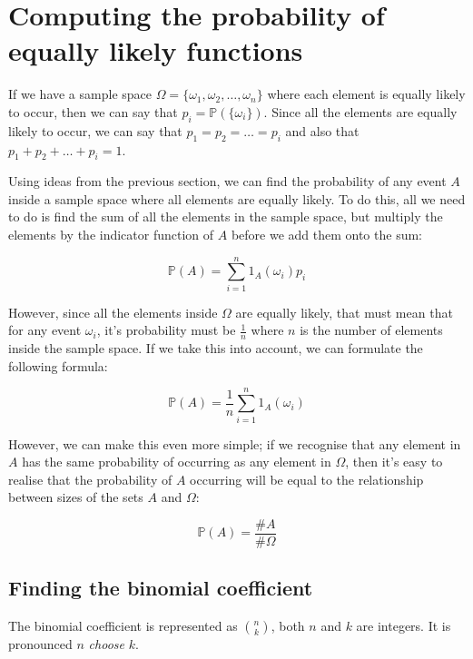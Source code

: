 \section{Computing the probability of equally likely functions}

If we have a sample space $\Omega = \{ \omega_1, \omega_2, \dots, \omega_n \}$
where each element is equally likely to occur, then we can say that $p_i =
\mathbb{P}(\{\omega_i\})$. Since all the elements are equally likely to occur,
we can say that $p_1 = p_2 = \dots = p_i$ and also that $p_1 + p_2 + \dots + p_i
= 1$.

Using ideas from the previous section, we can find the probability of any event
$A$ inside a sample space where all elements are equally likely. To do this, all
we need to do is find the sum of all the elements in the sample space, but
multiply the elements by the indicator function of $A$ before we add them onto
the sum:

\begin{dmath*}
	\mathbb{P}(A) = \sum\limits_{i=1}^{n} 1_A(\omega_i)p_i
\end{dmath*}

However, since all the elements inside $\Omega$ are equally likely, that must
mean that for any event $\omega_i$, it's probability must be $\frac{1}{n}$ where
$n$ is the number of elements inside the sample space. If we take this into
account, we can formulate the following formula:

\begin{dmath*}
	\mathbb{P}(A) = \frac{1}{n}\sum\limits_{i=1}^{n} 1_A(\omega_i)
\end{dmath*}


However, we can make this even more simple; if we recognise that any element in
$A$ has the same probability of occurring as any element in $\Omega$, then it's
easy to realise that the probability of $A$ occurring will be equal to the
relationship between sizes of the sets $A$ and $\Omega$:

\begin{dmath*}
	\mathbb{P}(A) = \frac{\#A}{\#\Omega}
\end{dmath*}

\subsection{Finding the binomial coefficient}

The binomial coefficient is represented as $n \choose k$, both $n$ and $k$ are
integers. It is pronounced $n$ {\it choose} $k$.

